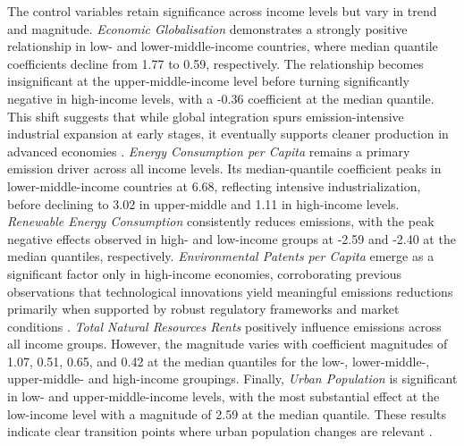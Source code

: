 \documentclass[10pt]{article}
\begin{document}
The control variables retain significance across income levels but vary in trend and magnitude. \textit{Economic Globalisation} demonstrates a strongly positive relationship in low- and lower-middle-income countries, where median quantile coefficients decline from 1.77 to 0.59, respectively. The relationship becomes insignificant at the upper-middle-income level before turning significantly negative in high-income levels, with a -0.36 coefficient at the median quantile. This shift suggests that while global integration spurs emission-intensive industrial expansion at early stages, it eventually supports cleaner production in advanced economies \citep{EconomicGlobalisationCO2}. \textit{Energy Consumption per Capita} remains a primary emission driver across all income levels. Its median-quantile coefficient peaks in lower-middle-income countries at 6.68, reflecting intensive industrialization, before declining to 3.02 in upper-middle and 1.11 in high-income levels. \textit{Renewable Energy Consumption} consistently reduces emissions, with the peak negative effects observed in high- and low-income groups at -2.59 and -2.40 at the median quantiles, respectively. \textit{Environmental Patents per Capita} emerge as a significant factor only in high-income economies, corroborating previous observations that technological innovations yield meaningful emissions reductions primarily when supported by robust regulatory frameworks and market conditions \citep{HE2021148908}. \textit{Total Natural Resources Rents} positively influence emissions across all income groups. However, the magnitude varies with coefficient magnitudes of 1.07, 0.51, 0.65, and 0.42 at the median quantiles for the low-, lower-middle-, upper-middle- and high-income groupings. Finally, \textit{Urban Population} is significant in low- and upper-middle-income levels, with the most substantial effect at the low-income level with a magnitude of 2.59 at the median quantile. These results indicate clear transition points where urban population changes are relevant \citep{LI20151107}.
\end{document}
